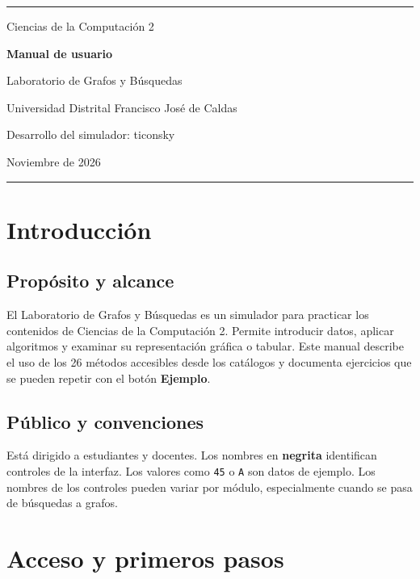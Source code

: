 \documentclass[11pt,a4paper]{report}
\newcommand{\boton}[1]{\textbf{#1}}
\begin{document}
\begin{titlepage}
\color{verde}
\rule{\textwidth}{1.2pt}
\vspace*{22mm}

{\Large Ciencias de la Computación 2\par}
\vspace{12mm}
{\Huge\bfseries Manual de usuario\par}
\vspace{5mm}
{\LARGE Laboratorio de Grafos y Búsquedas\par}
\vspace{18mm}
{\large Universidad Distrital Francisco José de Caldas\par}
\vfill
{\large Desarrollo del simulador: ticonsky\par}
{\large Noviembre de 2026\par}
\vspace{5mm}
\rule{\textwidth}{1.2pt}
\end{titlepage}
\setcounter{tocdepth}{1}
{\small\tableofcontents}

\chapter{Introducción}
\section{Propósito y alcance}
El Laboratorio de Grafos y Búsquedas es un simulador para practicar los contenidos de Ciencias de la Computación 2. Permite introducir datos, aplicar algoritmos y examinar su representación gráfica o tabular. Este manual describe el uso de los 26 métodos accesibles desde los catálogos y documenta ejercicios que se pueden repetir con el botón \boton{Ejemplo}.

\section{Público y convenciones}
Está dirigido a estudiantes y docentes. Los nombres en \textbf{negrita} identifican controles de la interfaz. Los valores como \texttt{45} o \texttt{A} son datos de ejemplo. Los nombres de los controles pueden variar por módulo, especialmente cuando se pasa de búsquedas a grafos.

\chapter{Acceso y primeros pasos}
\end{document}
